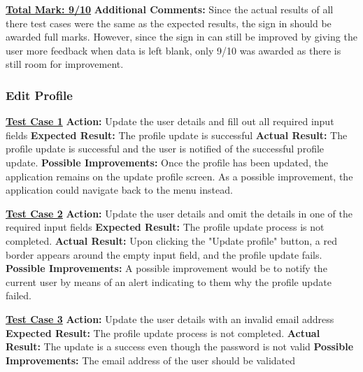 \documentclass[english]{article}
\begin{document}
\textbf{\underline{Total Mark: 9/10}}\newline
\textbf{Additional Comments:} Since the actual results of all there test cases were the same as the expected results, the sign in should be awarded full marks. However, since the sign in can still be improved by giving the user more feedback when data is left blank, only 9/10 was awarded as there is still room for improvement.\newline

\subsubsection{Edit Profile}
\textbf{\underline{Test Case 1}}\newline
\textbf{Action:} Update the user details and fill out all required input fields\newline
\textbf{Expected Result:} The profile update is successful\newline
\textbf{Actual Result:} The profile update is successful and the user is notified of the successful profile update.\newline
\textbf{Possible Improvements:} Once the profile has been updated, the application remains on the update profile screen. As a possible improvement, the application could navigate back to the menu instead.\newline

\textbf{\underline{Test Case 2}}\newline
\textbf{Action:} Update the user details and omit the details in one of the required input fields\newline
\textbf{Expected Result:} The profile update process is not completed.\newline
\textbf{Actual Result:} Upon clicking the "Update profile" button, a red border appears around the empty input field, and the profile update fails.\newline
\textbf{Possible Improvements:} A possible improvement would be to notify the current user by means of an alert indicating to them why the profile update failed.\newline

\textbf{\underline{Test Case 3}}\newline
\textbf{Action:} Update the user details with an invalid email address\newline
\textbf{Expected Result:} The profile update process is not completed.\newline
\textbf{Actual Result:} The update is a success even though the password is not valid\newline
\textbf{Possible Improvements:} The email address of the user should be validated \newline
\end{document}
